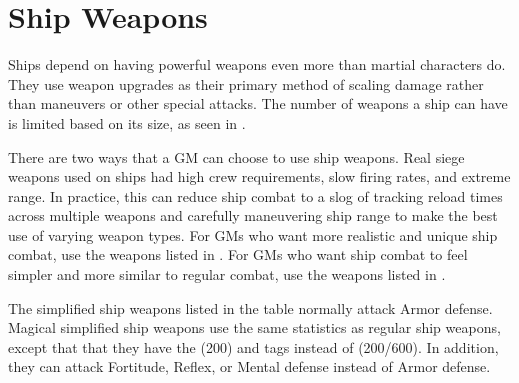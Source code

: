
\section{Ship Weapons}\label{Ship Weapons}
  Ships depend on having powerful weapons even more than martial characters do.
  They use weapon upgrades as their primary method of scaling damage rather than maneuvers or other special attacks.
  The number of weapons a ship can have is limited based on its size, as seen in .

  There are two ways that a GM can choose to use ship weapons.
  Real siege weapons used on ships had high crew requirements, slow firing rates, and extreme range.
  In practice, this can reduce ship combat to a slog of tracking reload times across multiple weapons and carefully maneuvering ship range to make the best use of varying weapon types.
  For GMs who want more realistic and unique ship combat, use the weapons listed in .
  For GMs who want ship combat to feel simpler and more similar to regular combat, use the weapons listed in .

  The simplified ship weapons listed in the table normally attack Armor defense.
  Magical simplified ship weapons use the same statistics as regular ship weapons, except that that they have the  (200) and  tags instead of  (200/600).
  In addition, they can attack Fortitude, Reflex, or Mental defense instead of Armor defense.

